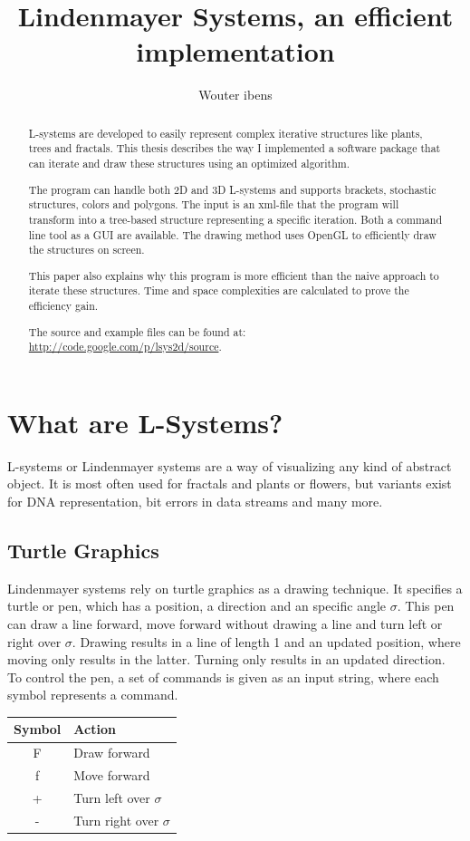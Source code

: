 \documentclass[11pt,a4paper]{article}
\author{Wouter ibens}
\title{Lindenmayer Systems, an efficient implementation}
\begin{document}
\maketitle
\tableofcontents
\newpage

\begin{abstract}
L-systems are developed to easily represent complex iterative structures like plants, trees and fractals. This thesis describes the way I implemented a software package that can iterate and draw these structures using an optimized algorithm.

The program can handle both 2D and 3D L-systems and supports brackets, stochastic structures, colors and polygons. The input is an xml-file that the program will transform into a tree-based structure representing a specific iteration. Both a command line tool as a GUI are available. The drawing method uses OpenGL to efficiently draw the structures on screen.

This paper also explains why this program is more efficient than the naive approach to iterate these structures. Time and space complexities are calculated to prove the efficiency gain.

The source and example files can be found at: \url{http://code.google.com/p/lsys2d/source}.
\end{abstract}

\newpage

\section{What are L-Systems?}
L-systems or Lindenmayer systems are a way of visualizing any kind of abstract object. It is most often used for fractals and plants or flowers, but variants exist for DNA representation, bit errors in data streams and many more.

\subsection{Turtle Graphics}
Lindenmayer systems rely on turtle graphics as a drawing technique. It specifies a turtle or pen, which has a position, a direction and an specific angle $\sigma$. This pen can draw a line forward, move forward without drawing a line and turn left or right over $\sigma$. Drawing results in a line of length 1 and an updated position, where moving only results in the latter. Turning only results in an updated direction.
To control the pen, a set of commands is given as an input string, where each symbol represents a command.
\begin{center}
\begin{tabular}{c | l}
Symbol & Action \\ \hline
F & Draw forward \\
f & Move forward \\
+ & Turn left over $\sigma$ \\
- & Turn right over $\sigma$
\end{tabular}
\end{center}
\end{document}
